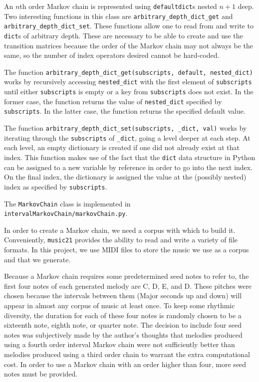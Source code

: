 An $n$th order Markov chain is represented using \texttt{defaultdict}s nested $n + 1$ deep.
Two interesting functions in this class are \texttt{arbitrary\_depth\_dict\_get} and \texttt{arbitrary\_depth\_dict\_set}.
These functions allow one to read from and write to \texttt{dict}s of arbitrary depth.
These are necessary to be able to create and use the transition matrices because the order of the Markov chain may not always be the same, so the number of index operators desired cannot be hard-coded.

The function \texttt{arbitrary\_depth\_dict\_get(subscripts, default, nested\_dict)} works by recursively accessing \texttt{nested\_dict} with the first element of \texttt{subscripts} until either \texttt{subscripts} is empty or a key from \texttt{subscripts} does not exist.
In the former case, the function returns the value of \texttt{nested\_dict} specified by \texttt{subscripts}.
In the latter case, the function returns the specified default value.

The function \texttt{arbitrary\_depth\_dict\_set(subscripts, \_dict, val)} works by iterating through the \texttt{subscripts} of \texttt{\_dict}, going a level deeper at each step.
At each level, an empty dictionary is created if one did not already exist at that index.
This function makes use of the fact that the \texttt{dict} data structure in Python can be assigned to a new variable by reference in order to go into the next index.
On the final index, the dictionary is assigned the value at the (possibly nested) index as specified by \texttt{subscripts}.

The \texttt{MarkovChain} class is implemented in \texttt{intervalMarkovChain/markovChain.py}.

In order to create a Markov chain, we need a corpus with which to build it.
Conveniently, \texttt{music21} provides the ability to read and write a variety of file formats.
In this project, we use MIDI files to store the music we use as a corpus and that we generate.

Because a Markov chain requires some predetermined seed notes to refer to, the first four notes of each generated melody are C, D, E, and D.
These pitches were chosen because the intervals between them (Major seconds up and down) will appear in almost any corpus of music at least once.
To keep some rhythmic diversity, the duration for each of these four notes is randomly chosen to be a sixteenth note, eighth note, or quarter note.
The decision to include four seed notes was subjectively made by the author's thoughts that melodies produced using a fourth order interval Markov chain were not sufficiently better than melodies produced using a third order chain to warrant the extra computational cost.
In order to use a Markov chain with an order higher than four, more seed notes must be provided.

